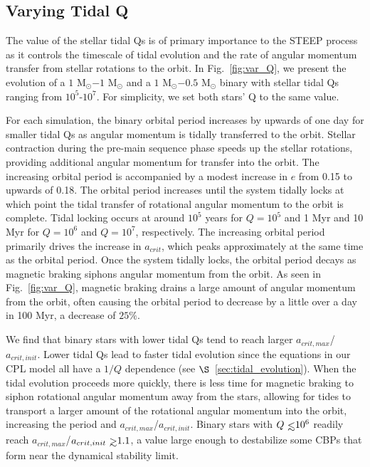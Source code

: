 \subsection{Varying Tidal Q} \label{sec:var_Q}

The value of the stellar tidal Qs is of primary importance to the STEEP process as it controls the timescale of tidal evolution and the rate of angular momentum transfer from stellar rotations to the orbit.  In Fig.~\ref{fig:var_Q}, we present the evolution of a $1$ M$_{\odot}$$-1$ M$_{\odot}$ and a $1$ M$_{\odot}$$-0.5$ M$_{\odot}$ binary with stellar tidal Qs ranging from $10^5$-$10^7$.  For simplicity, we set both stars' Q to the same value.  

For each simulation, the binary orbital period increases by upwards of one day for smaller tidal Qs as angular momentum is tidally transferred to the orbit.  Stellar contraction during the pre-main sequence phase speeds up the stellar rotations, providing additional angular momentum for transfer into the orbit.  The increasing orbital period is accompanied by a modest increase in $e$ from 0.15 to upwards of 0.18.  The orbital period increases until the system tidally locks at which point the tidal transfer of rotational angular momentum to the orbit is complete.  Tidal locking occurs at around $10^5$ years for $Q=10^5$ and 1 Myr and 10 Myr for $Q=10^6$ and $Q=10^7$, respectively.  The increasing orbital period primarily drives the increase in $a_{crit}$, which peaks approximately at the same time as the orbital period.  Once the system tidally locks, the orbital period decays as magnetic braking siphons angular momentum from the orbit.  As seen in Fig.~\ref{fig:var_Q}, magnetic braking drains a large amount of angular momentum from the orbit, often causing the orbital period to decrease by a little over a day in 100 Myr, a decrease of $25\%$.

We find that binary stars with lower tidal Qs tend to reach larger $a_{crit,max}$/$a_{crit,init}$.  Lower tidal Qs lead to faster tidal evolution since the equations in our CPL model all have a $1/Q$ dependence (see $\S$~\ref{sec:tidal_evolution}).  When the tidal evolution proceeds more quickly, there is less time for magnetic braking to siphon rotational angular momentum away from the stars, allowing for tides to transport a larger amount of the rotational angular momentum into the orbit, increasing the period and $a_{crit,max}$/$a_{crit,init}$.  Binary stars with $Q \lsim 10^6$ readily reach $a_{crit,max}$/$a_{crit,init} \gsim 1.1$, a value large enough to destabilize some CBPs that form near the dynamical stability limit.

